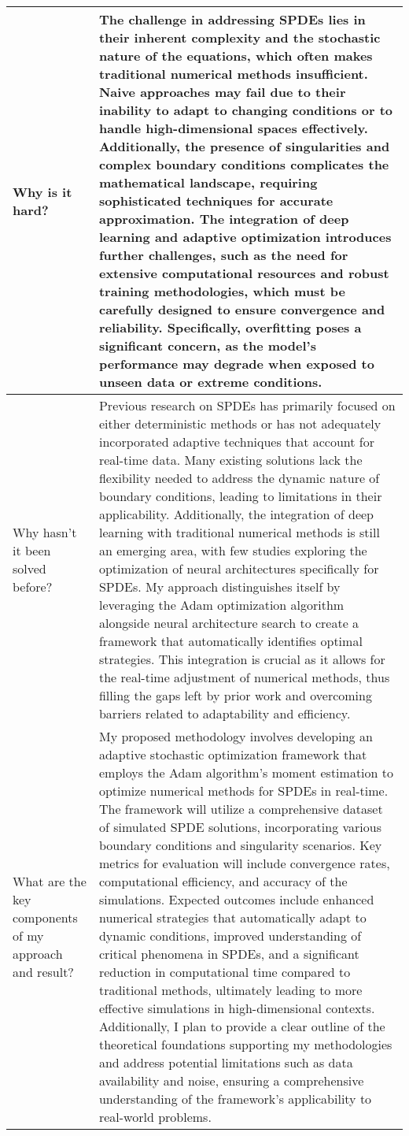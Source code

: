 \begin{table*}[htbp]
\begin{tabular}{p{3.5cm}p{12cm}}
Why is it hard? & 
The challenge in addressing SPDEs lies in their inherent complexity and the stochastic nature of the equations, which often makes traditional numerical methods insufficient. Naive approaches may fail due to their inability to adapt to changing conditions or to handle high-dimensional spaces effectively. Additionally, the presence of singularities and complex boundary conditions complicates the mathematical landscape, requiring sophisticated techniques for accurate approximation. The integration of deep learning and adaptive optimization introduces further challenges, such as the need for extensive computational resources and robust training methodologies, which must be carefully designed to ensure convergence and reliability. Specifically, overfitting poses a significant concern, as the model's performance may degrade when exposed to unseen data or extreme conditions.
\\ \midrule
Why hasn't it been solved before? & 
Previous research on SPDEs has primarily focused on either deterministic methods or has not adequately incorporated adaptive techniques that account for real-time data. Many existing solutions lack the flexibility needed to address the dynamic nature of boundary conditions, leading to limitations in their applicability. Additionally, the integration of deep learning with traditional numerical methods is still an emerging area, with few studies exploring the optimization of neural architectures specifically for SPDEs. My approach distinguishes itself by leveraging the Adam optimization algorithm alongside neural architecture search to create a framework that automatically identifies optimal strategies. This integration is crucial as it allows for the real-time adjustment of numerical methods, thus filling the gaps left by prior work and overcoming barriers related to adaptability and efficiency.\\ \midrule
What are the key components of my approach and result? & 
My proposed methodology involves developing an adaptive stochastic optimization framework that employs the Adam algorithm's moment estimation to optimize numerical methods for SPDEs in real-time. The framework will utilize a comprehensive dataset of simulated SPDE solutions, incorporating various boundary conditions and singularity scenarios. Key metrics for evaluation will include convergence rates, computational efficiency, and accuracy of the simulations. Expected outcomes include enhanced numerical strategies that automatically adapt to dynamic conditions, improved understanding of critical phenomena in SPDEs, and a significant reduction in computational time compared to traditional methods, ultimately leading to more effective simulations in high-dimensional contexts. Additionally, I plan to provide a clear outline of the theoretical foundations supporting my methodologies and address potential limitations such as data availability and noise, ensuring a comprehensive understanding of the framework's applicability to real-world problems.\\ 

\end{tabular}
\end{table*}
